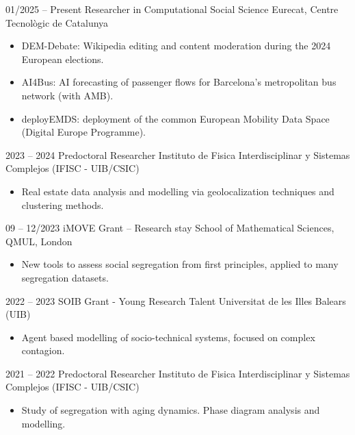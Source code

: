 \documentclass[9pt]{developercv} %
\begin{document}
\vspace{-10 pt}
\begin{entrylist}
	\entry
		{01/2025 -- Present}
		{Researcher in Computational Social Science}
		{Eurecat, Centre Tecnològic de Catalunya}
		{\vspace{-10pt}
        \begin{itemize}[noitemsep,topsep=0pt,parsep=0pt,partopsep=0pt, leftmargin=-1pt]
            \item DEM-Debate: Wikipedia editing and content moderation during the 2024 European elections.
            \item AI4Bus: AI forecasting of passenger flows for Barcelona's metropolitan bus network (with AMB).
            \item deployEMDS: deployment of the common European Mobility Data Space (Digital Europe Programme).
        \end{itemize}}
	\entry
        {2023 -- 2024}
		{Predoctoral Researcher}
		{Instituto de Fisica Interdisciplinar y Sistemas Complejos (IFISC - UIB/CSIC)}
		{\vspace{-10pt}
        \begin{itemize}[noitemsep,topsep=0pt,parsep=0pt,partopsep=0pt, leftmargin=-1pt]
            \item Real estate data analysis and modelling via geolocalization techniques and clustering methods.
        \end{itemize}}
        \entry
		{09 -- 12/2023}
		{iMOVE Grant -- Research stay}
		{School of Mathematical Sciences, QMUL, London}
		{\vspace{-10pt}
        \begin{itemize}[noitemsep,topsep=0pt,parsep=0pt,partopsep=0pt, leftmargin=-1pt]
            \item New tools to assess social segregation from first principles, applied to many segregation datasets.
        \end{itemize} }
	\entry
		{2022 -- 2023}
		{SOIB Grant - Young Research Talent}
		{Universitat de les Illes Balears (UIB)}
		{\vspace{-10pt}
        \begin{itemize}[noitemsep,topsep=0pt,parsep=0pt,partopsep=0pt, leftmargin=-1pt]
            \item Agent based modelling of socio-technical systems, focused on complex contagion.
        \end{itemize} }
	\entry
		{2021 -- 2022}
		{Predoctoral Researcher}
		{Instituto de Fisica Interdisciplinar y Sistemas Complejos (IFISC - UIB/CSIC)}
		{\vspace{-10pt}
        \begin{itemize}[noitemsep,topsep=0pt,parsep=0pt,partopsep=0pt, leftmargin=-1pt]
            \item Study of segregation with aging dynamics. Phase diagram analysis and modelling.
        \end{itemize}}
\end{entrylist}
\end{document}
